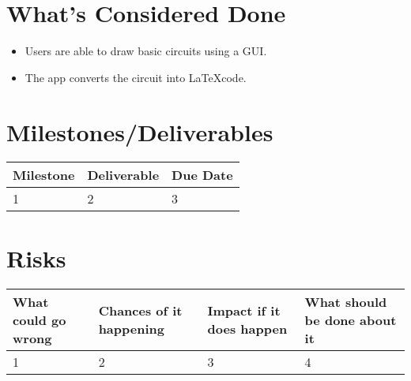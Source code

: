 \section*{What's Considered Done}
\begin{itemize}
    \item Users are able to draw basic circuits using a GUI.
    \item The app converts the circuit into \LaTeX code.
\end{itemize}

\section*{Milestones/Deliverables}
\begin{center}
    \begin{tabularx}{\textwidth}{|X|X|X|}
        \hline
        Milestone & Deliverable & Due Date \\
        \hline
        1 & 2 & 3 \\
        \hline
    \end{tabularx}
\end{center}

\section*{Risks}
\begin{tabularx}{\textwidth}{|X|X|X|X|}
    \hline
    What could go wrong & Chances of it happening & Impact if it does happen & What should be done about it \\
    \hline
    1 & 2 & 3 & 4\\
    \hline
\end{tabularx}
